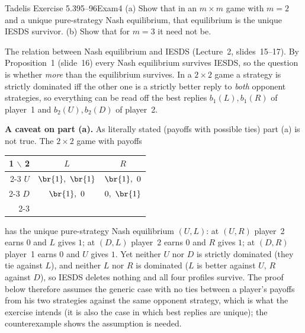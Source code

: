 \begin{exsol}{Tadelis Exercise 5.3}{95--96}{Exam}{4}
\asked (a) Show that in an $m\times m$ game with $m = 2$ and a unique pure-strategy Nash
equilibrium, that equilibrium is the unique IESDS survivor. (b) Show that for $m = 3$ it need not
be.

\method The relation between Nash equilibrium and IESDS (Lecture~2, slides~15--17). By
Proposition~1 (slide~16) every Nash equilibrium survives IESDS, so the question is whether
\emph{more} than the equilibrium survives. In a $2\times2$ game a strategy is strictly dominated iff
the other one is a strictly better reply to \emph{both} opponent strategies, so everything can be
read off the best replies $b_1(L), b_1(R)$ of player~1 and $b_2(U), b_2(D)$ of player~2.

\textbf{A caveat on part (a).} As literally stated (payoffs with possible ties) part (a) is not
true. The $2\times2$ game with payoffs
\begin{center}
\begin{tabular}{r|c|c|}
\multicolumn{1}{r}{1 $\backslash$ 2} & \multicolumn{1}{c}{$L$} & \multicolumn{1}{c}{$R$}\\ \cline{2-3}
$U$ & $\br{1},\ \br{1}$ & $\br{1},\ 0$ \\ \cline{2-3}
$D$ & $\br{1},\ 0$ & $0,\ \br{1}$ \\ \cline{2-3}
\end{tabular}
\end{center}
has the unique pure-strategy Nash equilibrium $(U, L)$: at $(U, R)$ player~2 earns $0$ and $L$ gives
$1$; at $(D, L)$ player~2 earns $0$ and $R$ gives $1$; at $(D, R)$ player~1 earns $0$ and $U$ gives $1$.
Yet neither $U$ nor $D$ is strictly dominated (they tie against $L$), and neither $L$ nor $R$ is
dominated ($L$ is better against $U$, $R$ against $D$), so IESDS deletes nothing and all four
profiles survive. The proof below therefore
assumes the generic case with no ties between a player's payoffs from his two strategies
against the same opponent strategy, which is what the exercise intends (it is also the case in
which best replies are unique); the counterexample shows the assumption is needed.


\end{exsol}
